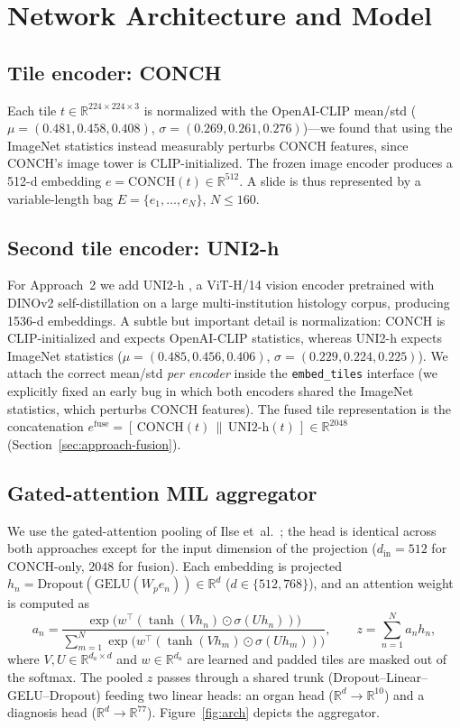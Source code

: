 \documentclass[11pt,a4paper]{article}
\newcommand{\code}[1]{\texttt{\small #1}}
\begin{document}
\section{Network Architecture and Model}
\label{sec:arch}

\subsection{Tile encoder: CONCH}
Each tile $t \in \mathbb{R}^{224\times224\times3}$ is normalized with the OpenAI-CLIP mean/std
($\mu=(0.481,0.458,0.408)$, $\sigma=(0.269,0.261,0.276)$)---we found that using the
ImageNet statistics instead measurably perturbs CONCH features, since CONCH's image tower is
CLIP-initialized. The frozen image encoder produces a 512-d embedding
$e = \text{CONCH}(t) \in \mathbb{R}^{512}$. A slide is thus represented by a variable-length bag
$E = \{e_1,\dots,e_N\}$, $N \le 160$.

\subsection{Second tile encoder: UNI2-h}
For Approach~2 we add UNI2-h \cite{chen2024uni}, a ViT-H/14 vision encoder pretrained with
DINOv2 self-distillation on a large multi-institution histology corpus, producing 1536-d
embeddings. A subtle but important detail is normalization: CONCH is CLIP-initialized and expects
OpenAI-CLIP statistics, whereas UNI2-h expects ImageNet statistics ($\mu=(0.485,0.456,0.406)$,
$\sigma=(0.229,0.224,0.225)$). We attach the correct mean/std \emph{per encoder} inside the
\code{embed\_tiles} interface (we explicitly fixed an early bug in which both encoders shared the
ImageNet statistics, which perturbs CONCH features). The fused tile representation is the
concatenation $e^{\text{fuse}}=[\,\text{CONCH}(t)\,\|\,\text{UNI2-h}(t)\,]\in\mathbb{R}^{2048}$
(Section~\ref{sec:approach-fusion}).

\subsection{Gated-attention MIL aggregator}
We use the gated-attention pooling of Ilse et~al.\ \cite{ilse2018attention}; the head is identical
across both approaches except for the input dimension of the projection
($d_{\text{in}}=512$ for CONCH-only, $2048$ for fusion). Each embedding is
projected $h_n = \text{Dropout}(\text{GELU}(W_p e_n)) \in \mathbb{R}^{d}$ ($d\in\{512,768\}$),
and an attention weight is computed as
\begin{equation}
a_n = \frac{\exp\!\big(w^\top (\tanh(V h_n)\odot\sigma(U h_n))\big)}
           {\sum_{m=1}^{N}\exp\!\big(w^\top (\tanh(V h_m)\odot\sigma(U h_m))\big)},
\qquad z = \sum_{n=1}^{N} a_n h_n ,
\end{equation}
where $V,U \in \mathbb{R}^{d_a\times d}$ and $w\in\mathbb{R}^{d_a}$ are learned and padded tiles
are masked out of the softmax. The pooled $z$ passes through a shared trunk
(Dropout--Linear--GELU--Dropout) feeding two linear heads: an organ head
($\mathbb{R}^{d}\!\to\!\mathbb{R}^{10}$) and a diagnosis head
($\mathbb{R}^{d}\!\to\!\mathbb{R}^{77}$). Figure~\ref{fig:arch} depicts the aggregator.
\end{document}
